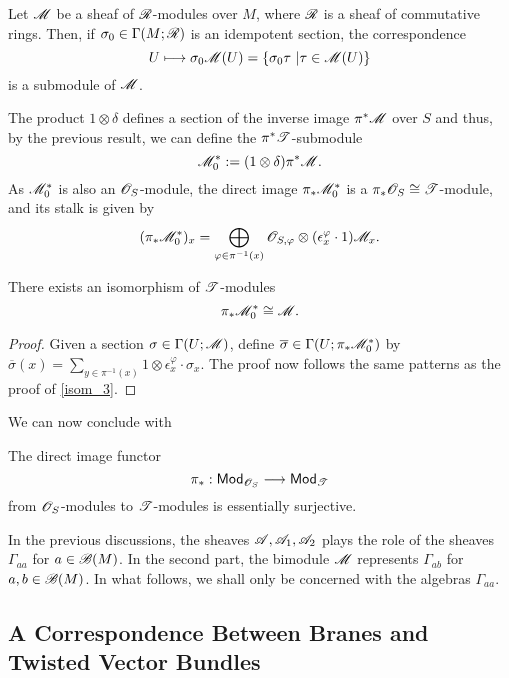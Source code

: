 \begin{lemma}
Let $\mathscr{M}$ be a sheaf of $\mathscr{R}$-modules over $M$, where $\mathscr{R}$ is a sheaf of commutative rings. Then, if $\sigma_0 \in \Gamma (M;\mathscr{R})$ is an idempotent section, the correspondence
$$U\longmapsto \sigma_0 \mathscr{M}(U)=\{\sigma_0\tau \ | \tau \in \mathscr{M}(U)\}$$
is a submodule of $\mathscr{M}$. 
\end{lemma}

The product $1\otimes \delta$ defines a section of the inverse image $\pi^*\mathscr{M}$ over $S$ and thus, by the previous result, we can define the $\pi^*\mathscr{T}$-submodule
$$\mathscr{M}_0^*:=(1\otimes \delta )\pi^*\mathscr{M}.$$
As $\mathscr{M}^*_0$ is also an $\mathscr{O}_S$-module, the direct image $\pi_*\mathscr{M}_0^*$ is a $\pi_*\mathscr{O}_S\cong \mathscr{T}$-module, and its stalk is given by
$$(\pi_*\mathscr{M}_0^*)_x=\bigoplus_{\varphi \in \pi^{-1}(x)}\mathscr{O}_{S,\varphi }\otimes (\epsilon^{\varphi}_x\cdot 1)\mathscr{M}_x.$$

\begin{proposition}	\label{isom_4}
There exists an isomorphism of $\mathscr{T}$-modules
$$\pi_*\mathscr{M}^*_0\cong \mathscr{M}.$$
\end{proposition}
\begin{proof}
Given a section $\sigma \in \Gamma (U;\mathscr{M})$, define $\overline{\sigma}\in \Gamma (U;\pi_*\mathscr{M}^*_0)$ by
$\overline{\sigma}(x)=\sum_{y\in \pi^{-1}(x)}1\otimes \epsilon^{\varphi}_x\cdot \sigma_x$. The proof now follows the same patterns as the proof of \ref{isom_3}.
\end{proof}

We can now conclude with

\begin{theorem}
The direct image functor
$$\pi_*:\mathsf{Mod}_{\mathscr{O}_S}\longrightarrow \mathsf{Mod}_{\mathscr{T}}$$
from $\mathscr{O}_S$-modules to $\mathscr{T}$-modules is essentially surjective.
\end{theorem}

\begin{obs}
In the previous discussions, the sheaves $\mathscr{A},\mathscr{A}_1,\mathscr{A}_2$ plays the role of the sheaves $\Gamma_{aa}$ for $a\in \mathscr{B}(M)$. In the second part, the bimodule $\mathscr{M}$ represents $\Gamma_{ab}$ for $a,b\in \mathscr{B}(M)$. In what follows, we shall only be concerned with the algebras $\Gamma_{aa}$.
\end{obs}



\subsection{A Correspondence Between Branes and Twisted Vector Bundles}

